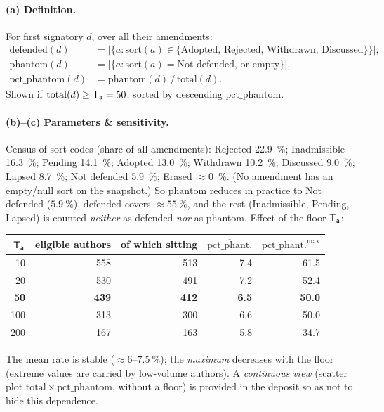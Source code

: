 \paragraph{(a) Definition.} For first signatory $d$, over all their amendments:
\[
\begin{aligned}
\mathrm{defended}(d) &= \big|\{a : \mathrm{sort}(a)\in\{\text{Adopted, Rejected, Withdrawn, Discussed}\}\}\big|,\\[2pt]
\mathrm{phantom}(d) &= \big|\{a : \mathrm{sort}(a)=\text{Not defended, or empty}\}\big|,\\[2pt]
\mathrm{pct\_phantom}(d) &= \mathrm{phantom}(d)\,/\,\mathrm{total}(d).
\end{aligned}
\]
Shown if $\mathrm{total}(d)\ge \mathsf{T_a}=50$; sorted by descending
$\mathrm{pct\_phantom}$.

\paragraph{(b)--(c) Parameters \& sensitivity.} Census of \og{}sort\fg{} codes
(share of all amendments): Rejected 22.9~\%; Inadmissible 16.3~\%; Pending 14.1~\%;
Adopted 13.0~\%; Withdrawn 10.2~\%; Discussed 9.0~\%; Lapsed 8.7~\%; Not defended
5.9~\%; Erased $\approx$0~\%. (No amendment has an empty/null sort on the snapshot.)
So $\mathrm{phantom}$ reduces in practice to \og{}Not defended\fg{} ($5.9~\%$),
$\mathrm{defended}$ covers $\approx 55~\%$, and the rest (Inadmissible, Pending,
Lapsed) is counted \emph{neither} as defended \emph{nor} as phantom. Effect of the
floor $\mathsf{T_a}$:
\begin{center}\small
\begin{tabular}{rrrrr}
\toprule
$\mathsf{T_a}$ & eligible authors & of which sitting & $\overline{\mathrm{pct\_phant.}}$ & $\mathrm{pct\_phant.}^{\max}$ \\
\midrule
10  & 558 & 513 & 7.4 & 61.5 \\
20  & 530 & 491 & 7.2 & 52.4 \\
\textbf{50}  & \textbf{439} & \textbf{412} & \textbf{6.5} & \textbf{50.0} \\
100 & 313 & 300 & 6.6 & 50.0 \\
200 & 167 & 163 & 5.8 & 34.7 \\
\bottomrule
\end{tabular}
\end{center}
The mean rate is stable ($\approx 6$--$7.5~\%$); the \emph{maximum} decreases with
the floor (extreme values are carried by low-volume authors). A \emph{continuous
view} (scatter plot $\mathrm{total}\times\mathrm{pct\_phantom}$, without a floor) is
provided in the deposit so as not to hide this dependence.

